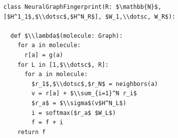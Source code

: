 \documentclass[border=10pt]{standalone}
\begin{document}
\begin{lstlisting}
class NeuralGraphFingerprint(R: $\mathbb{N}$, [$H^1_1$,$\\dotsc$,$H^N_R$], $W_1,\\dotsc, W_R$):

  def $\\lambda$(molecule: Graph):
    for a in molecule:
      r[a] = g(a)
    for L in [1,$\\dotsc$, R]:
      for a in molecule:
        $r_1$,$\\dotsc$,$r_N$ = neighbors(a)
        v = r[a] + $\\sum_{i=1}^N r_i$
        $r_a$ = $\\sigma$(v$H^N_L$)
        i = softmax($r_a$ $W_L$)
        f = f + i
    return f
\end{lstlisting}
\end{document}
